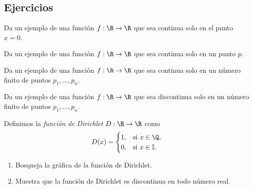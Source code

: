 \documentclass[12pt,a4paper]{book}
\newcommand{\I}{\mathbb{I}}
\begin{document}
    \par{}\subsection*{Ejercicios}

    \begin{ejercicio}\label{ej:190}
        Da un ejemplo de una función $f:\R\to\R$ que sea continua
        solo en el punto $x=0$.
    \end{ejercicio}

    \begin{ejercicio}\label{ej:191}
        Da un ejemplo de una función $f:\R\to\R$ que sea continua
        solo en un punto $p$.
    \end{ejercicio}

    \begin{ejercicio}\label{ej:192}
        Da un ejemplo de una función $f:\R\to\R$ que sea continua
        solo en un número finito de puntos $p_{1},\ldots,p_{n}$.
    \end{ejercicio}

    \begin{ejercicio}\label{ej:193}
        Da un ejemplo de una función $f:\R\to\R$ que sea discontinua
        solo en un número finito de puntos $p_{1},\ldots,p_{n}$.
    \end{ejercicio}

    \begin{ejercicio}\label{ej:194}
        Definimos la \textit{función de Dirichlet}
        $D:\R\to\R$ como
        \begin{equation*}
            D(x)=\begin{cases}
                1, & \text{si }x\in\Q,\\
                0, & \text{si }x\in\I.
            \end{cases}
        \end{equation*}
        \begin{enumerate}[nosep]
            \item Bosqueja la gráfica de la función de Dirichlet.
            \item Muestra que la función de Dirichlet es discontinua en todo número real.
        \end{enumerate}
    \end{ejercicio}
\end{document}
